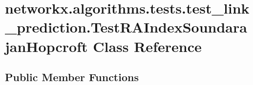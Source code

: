 \hypertarget{classnetworkx_1_1algorithms_1_1tests_1_1test__link__prediction_1_1TestRAIndexSoundarajanHopcroft}{}\section{networkx.\+algorithms.\+tests.\+test\+\_\+link\+\_\+prediction.\+Test\+R\+A\+Index\+Soundarajan\+Hopcroft Class Reference}
\label{classnetworkx_1_1algorithms_1_1tests_1_1test__link__prediction_1_1TestRAIndexSoundarajanHopcroft}
\subsection*{Public Member Functions}

